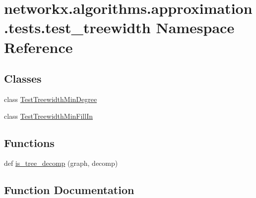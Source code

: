 \hypertarget{namespacenetworkx_1_1algorithms_1_1approximation_1_1tests_1_1test__treewidth}{}\section{networkx.\+algorithms.\+approximation.\+tests.\+test\+\_\+treewidth Namespace Reference}
\label{namespacenetworkx_1_1algorithms_1_1approximation_1_1tests_1_1test__treewidth}
\subsection*{Classes}
\begin{DoxyCompactItemize}
\item 
class \hyperlink{classnetworkx_1_1algorithms_1_1approximation_1_1tests_1_1test__treewidth_1_1TestTreewidthMinDegree}{Test\+Treewidth\+Min\+Degree}
\item 
class \hyperlink{classnetworkx_1_1algorithms_1_1approximation_1_1tests_1_1test__treewidth_1_1TestTreewidthMinFillIn}{Test\+Treewidth\+Min\+Fill\+In}
\end{DoxyCompactItemize}
\subsection*{Functions}
\begin{DoxyCompactItemize}
\item 
def \hyperlink{namespacenetworkx_1_1algorithms_1_1approximation_1_1tests_1_1test__treewidth_ae620cd2e3c1998599c2f560b2024cfd8}{is\+\_\+tree\+\_\+decomp} (graph, decomp)
\end{DoxyCompactItemize}


\subsection{Function Documentation}
\mbox{\label{namespacenetworkx_1_1algorithms_1_1approximation_1_1tests_1_1test__treewidth_ae620cd2e3c1998599c2f560b2024cfd8}} 
